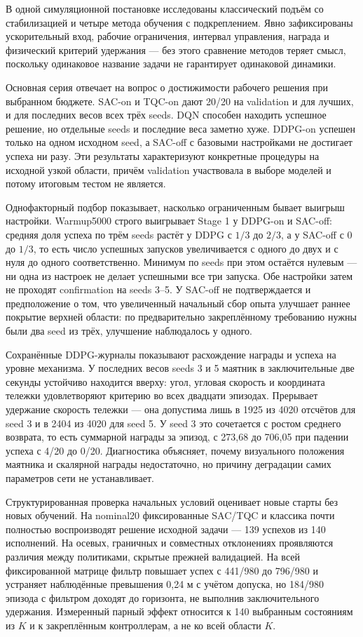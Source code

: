 В одной симуляционной постановке исследованы классический подъём со стабилизацией и четыре метода обучения с подкреплением. Явно зафиксированы ускорительный вход, рабочие ограничения, интервал управления, награда и физический критерий удержания — без этого сравнение методов теряет смысл, поскольку одинаковое название задачи не гарантирует одинаковой динамики.

Основная серия отвечает на вопрос о достижимости рабочего решения при выбранном бюджете. SAC-on и TQC-on дают 20/20 на validation и для лучших, и для последних весов всех трёх seeds. DQN способен находить успешное решение, но отдельные seeds и последние веса заметно хуже. DDPG-on успешен только на одном исходном seed, а SAC-off с базовыми настройками не достигает успеха ни разу. Эти результаты характеризуют конкретные процедуры на исходной узкой области, причём validation участвовала в выборе моделей и потому итоговым тестом не является.

Однофакторный подбор показывает, насколько ограниченным бывает выигрыш настройки. Warmup5000 строго выигрывает Stage 1 у DDPG-on и SAC-off: средняя доля успеха по трём seeds растёт у DDPG с $1/3$ до $2/3$, а у SAC-off с 0 до $1/3$, то есть число успешных запусков увеличивается с одного до двух и с нуля до одного соответственно. Минимум по seeds при этом остаётся нулевым — ни одна из настроек не делает успешными все три запуска. Обе настройки затем не проходят confirmation на seeds 3–5. У SAC-off не подтверждается и предположение о том, что увеличенный начальный сбор опыта улучшает раннее покрытие верхней области: по предварительно закреплённому требованию нужны были два seed из трёх, улучшение наблюдалось у одного.

Сохранённые DDPG-журналы показывают расхождение награды и успеха на уровне механизма. У последних весов seeds 3 и 5 маятник в заключительные две секунды устойчиво находится вверху: угол, угловая скорость и координата тележки удовлетворяют критерию во всех двадцати эпизодах. Прерывает удержание скорость тележки — она допустима лишь в 1925 из 4020 отсчётов для seed 3 и в 2404 из 4020 для seed 5. У seed 3 это сочетается с ростом среднего возврата, то есть суммарной награды за эпизод, с 273,68 до 706,05 при падении успеха с 4/20 до 0/20. Диагностика объясняет, почему визуального положения маятника и скалярной награды недостаточно, но причину деградации самих параметров сети не устанавливает.

Структурированная проверка начальных условий оценивает новые старты без новых обучений. На nominal20 фиксированные SAC/TQC и классика почти полностью воспроизводят решение исходной задачи — 139 успехов из 140 исполнений. На осевых, граничных и совместных отклонениях проявляются различия между политиками, скрытые прежней валидацией. На всей фиксированной матрице фильтр повышает успех с 441/980 до 796/980 и устраняет наблюдённые превышения 0,24 м с учётом допуска, но 184/980 эпизода с фильтром доходят до горизонта, не выполнив заключительного удержания. Измеренный парный эффект относится к 140 выбранным состояниям из $K$ и к закреплённым контроллерам, а не ко всей области $K$.

